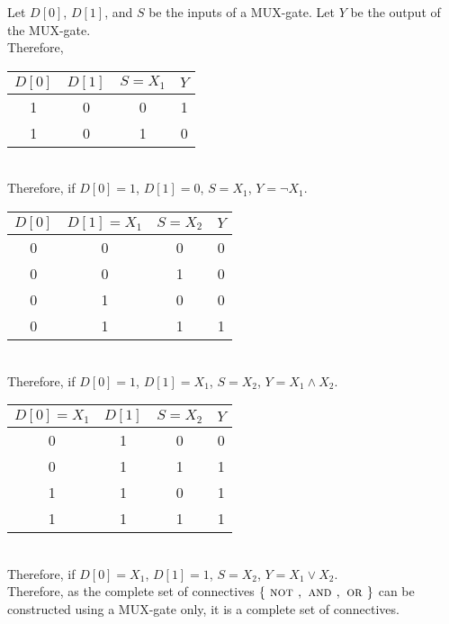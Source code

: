 \documentclass[fleqn, a4paper, 11pt, oneside]{amsart}
\theoremstyle{definition}
\theoremstyle{theorem}
\theoremstyle{remark}
\newcommand{\Not}{{\textsc{ not }}}
\renewcommand{\And}{{\textsc{ and }}}
\newcommand{\Or}{{\textsc{ or }}}
\newcommand{\AND}{\wedge}
\newcommand{\OR}{\vee}
\newcommand{\NOT}{\neg}
\begin{document}
\begin{solution}
	Let $D[0]$, $D[1]$, and $S$ be the inputs of a MUX-gate.
	Let $Y$ be the output of the MUX-gate.\\
	Therefore,\\
	\begin{tabular}{|c|c|c||c|}
		\hline
		$D[0]$ & $D[1]$ & $S = X_1$ & $Y$ \\
		\hline
		1      & 0      & 0         & 1   \\
		1      & 0      & 1         & 0   \\
		\hline
	\end{tabular}\\
	Therefore, if $D[0] = 1$, $D[1] = 0$, $S = X_1$, $Y = \NOT X_1$.\\
	\begin{tabular}{|c|c|c||c|}
		\hline
		$D[0]$ & $D[1] = X_1$ & $S = X_2$ & $Y$ \\
		\hline
		0      & 0            & 0         & 0   \\
		0      & 0            & 1         & 0   \\
		0      & 1            & 0         & 0   \\
		0      & 1            & 1         & 1   \\
		\hline
	\end{tabular}\\
	Therefore, if $D[0] = 1$, $D[1] = X_1$, $S = X_2$, $Y = X_1 \AND X_2$.\\
	\begin{tabular}{|c|c|c||c|}
		\hline
		$D[0] = X_1$ & $D[1]$ & $S = X_2$ & $Y$ \\
		\hline
		0            & 1      & 0         & 0   \\
		0            & 1      & 1         & 1   \\
		1            & 1      & 0         & 1   \\
		1            & 1      & 1         & 1   \\
		\hline
	\end{tabular}\\
	Therefore, if $D[0] = X_1$, $D[1] = 1$, $S = X_2$, $Y = X_1 \OR X_2$.\\
	Therefore, as the complete set of connectives $\left\{ \Not, \And, \Or \right\}$ can be constructed using a MUX-gate only, it is a complete set of connectives.
\end{solution}
\end{document}
